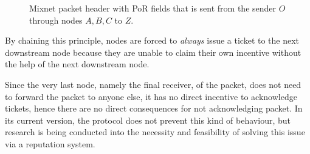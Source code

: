 \begin{figure}[H]
    \caption{Mixnet packet header with PoR fields that is sent from the sender $O$ through nodes $A, B, C$ to $Z$.}
\end{figure}

By chaining this principle, nodes are forced to \textit{always} issue a ticket to the next downstream node because they are unable to claim their own incentive without the help of the next downstream node.

Since the very last node, namely the final receiver, of the packet, does not need to forward the packet to anyone else, it has no direct incentive to acknowledge tickets, hence there are no direct consequences for not acknowledging packet. In its current version, the protocol does not prevent this kind of behaviour, but research is being conducted into the necessity and feasibility of solving this issue via a reputation system.